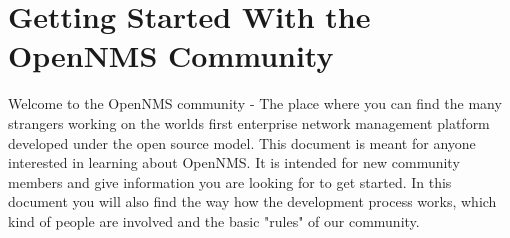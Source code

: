 \section{Getting Started With the OpenNMS Community}
Welcome to the OpenNMS community - The place where you can find the many strangers working on the worlds first enterprise network management platform developed under the open source model. This document is meant for anyone interested in learning about OpenNMS. It is intended for new community members and give information you are looking for to get started. In this document you will also find the way how the development process works, which kind of people are involved and the basic "rules" of our community.


